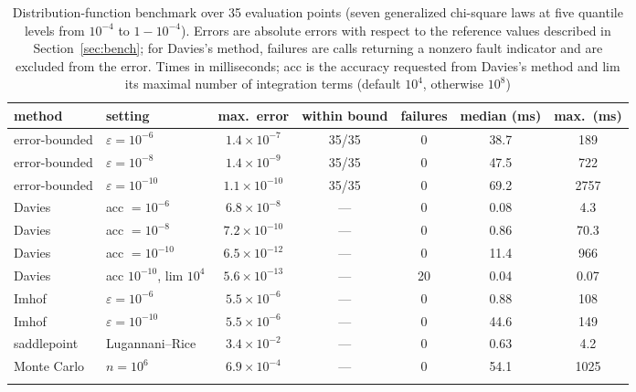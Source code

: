 \begin{table}[t]
\caption{Distribution-function benchmark over 35 evaluation points (seven generalized chi-square laws at five quantile levels from $10^{-4}$ to $1-10^{-4}$). Errors are absolute errors with respect to the reference values described in Section~\ref{sec:bench}; for Davies's method, failures are calls returning a nonzero fault indicator and are excluded from the error. Times in milliseconds; acc is the accuracy requested from Davies's method and lim its maximal number of integration terms (default $10^4$, otherwise $10^8$)}\label{tab:benchcdf}
\footnotesize\setlength{\tabcolsep}{4pt}
\begin{tabular*}{\textwidth}{@{\extracolsep\fill}llccccc@{}}
\toprule
method & setting & max.\ error & within bound & failures & median (ms) & max.\ (ms)\\
\midrule
error-bounded & $\varepsilon=10^{-6}$ & $1.4\times10^{-7}$ & 35/35 & 0 & 38.7 & 189\\
error-bounded & $\varepsilon=10^{-8}$ & $1.4\times10^{-9}$ & 35/35 & 0 & 47.5 & 722\\
error-bounded & $\varepsilon=10^{-10}$ & $1.1\times10^{-10}$ & 35/35 & 0 & 69.2 & 2757\\
Davies & acc $=10^{-6}$ & $6.8\times10^{-8}$ & --- & 0 & 0.08 & 4.3\\
Davies & acc $=10^{-8}$ & $7.2\times10^{-10}$ & --- & 0 & 0.86 & 70.3\\
Davies & acc $=10^{-10}$ & $6.5\times10^{-12}$ & --- & 0 & 11.4 & 966\\
Davies & acc $10^{-10}$, lim $10^4$ & $5.6\times10^{-13}$ & --- & 20 & 0.04 & 0.07\\
Imhof & $\varepsilon=10^{-6}$ & $5.5\times10^{-6}$ & --- & 0 & 0.88 & 108\\
Imhof & $\varepsilon=10^{-10}$ & $5.5\times10^{-6}$ & --- & 0 & 44.6 & 149\\
saddlepoint & Lugannani--Rice & $3.4\times10^{-2}$ & --- & 0 & 0.63 & 4.2\\
Monte Carlo & $n=10^6$ & $6.9\times10^{-4}$ & --- & 0 & 54.1 & 1025\\
\botrule
\end{tabular*}
\end{table}
